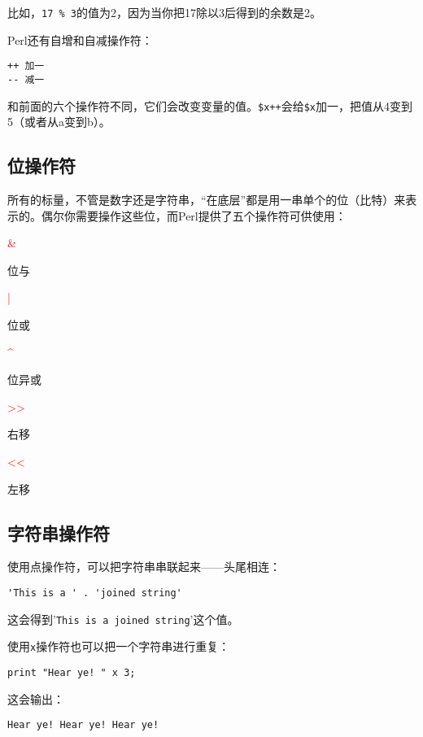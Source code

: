 比如，\verb|17 % 3|的值为2，因为当你把17除以3后得到的余数是2。

Perl还有自增和自减操作符：

\begin{lstlisting}
++ 加一
-- 减一
\end{lstlisting}

和前面的六个操作符不同，它们会改变变量的值。\verb|$x++|会给\verb|$x|加一，把值从4变到5（或者从a变到b）。

\subsection{位操作符}
所有的标量，不管是数字还是字符串，“在底层”都是用一串单个的位（比特）来表示的。偶尔你需要操作这些位，而Perl提供了五个操作符可供使用：

\noindent
\textcolor{red}{\&}
\begin{adjustwidth}{1cm}{}
位与
\end{adjustwidth}
\textcolor{red}{|}
\begin{adjustwidth}{1cm}{}
位或
\end{adjustwidth}
\textcolor{red}{\^{}}
\begin{adjustwidth}{1cm}{}
位异或
\end{adjustwidth}
\textcolor{red}{\textgreater\textgreater}
\begin{adjustwidth}{1cm}{}
右移
\end{adjustwidth}
\textcolor{red}{\textless\textless}
\begin{adjustwidth}{1cm}{}
左移
\end{adjustwidth}

\subsection{字符串操作符}
使用点操作符，可以把字符串串联起来——头尾相连：

\begin{lstlisting}
'This is a ' . 'joined string'
\end{lstlisting}

这会得到'\verb|This is a joined string|'这个值。

使用\verb|x|操作符也可以把一个字符串进行重复：

\begin{lstlisting}
print "Hear ye! " x 3;
\end{lstlisting}

这会输出：

\begin{lstlisting}
Hear ye! Hear ye! Hear ye!
\end{lstlisting}

